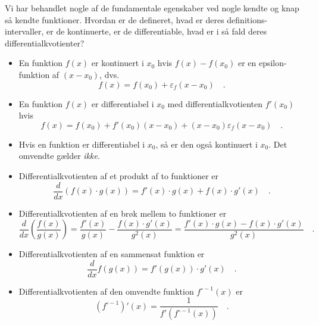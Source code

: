\begin{summary}
Vi har behandlet nogle af de fundamentale egenskaber ved nogle kendte og knap så kendte
funktioner. Hvordan er de defineret, hvad er deres definitions-intervaller, er de kontinuerte, er de differentiable, hvad
er i så fald deres differentialkvotienter?

\begin{itemize}
\item En funktion  $f(x)$ er kontinuert i $x_{0}$ hvis $f(x) - f(x_{0})$ er en epsilon-funktion af $(x - x_{0})$, dvs.
\begin{equation}
f(x) = f(x_{0}) + \varepsilon_{f}(x - x_{0}) \quad.
\end{equation}
\item En funktion $f(x)$ er differentiabel i $x_{0}$ med differentialkvotienten $f'(x_{0})$ hvis
\begin{equation*}
f(x) = f(x_{0}) + f'(x_{0})(x-x_{0}) + (x-x_{0})\varepsilon_{f}(x-x_{0})\quad .
\end{equation*}
\item Hvis en funktion er differentiabel i $x_{0}$, så er den også kontinuert i $x_{0}$. Det omvendte gælder \emph{ikke}.
\item Differentialkvotienten af et produkt af to funktioner er
\begin{equation}
\frac{d}{dx}\left(f(x)\cdot g(x)\right) = f'(x)\cdot g(x) + f(x)\cdot g'(x) \quad .
\end{equation}
\item Differentialkvotienten af en brøk mellem to funktioner er
\begin{equation}
\frac{d}{dx}\left( \frac{f(x)}{g(x)}\right) = \frac{f'(x)}{g(x)} - \frac{f(x) \cdot g'(x)}{g^{2}(x)}= \frac{f'(x)\cdot g(x) - f(x)\cdot g'(x)}{g^{2}(x)} \quad .
\end{equation}
\item Differentialkvotienten af en sammensat funktion er
\begin{equation} 
\frac{d}{dx} f(g(x)) = f'(g(x))\cdot g'(x) \quad .
\end{equation}

\item Differentialkvotienten af den omvendte funktion $f^{\circ-1}(x)$  er
\begin{equation}
\left(f^{\circ-1}\right)'(x) = \frac{1}{f'(f^{\circ-1}(x))} \quad .
\end{equation}
\end{itemize}



\end{summary}











